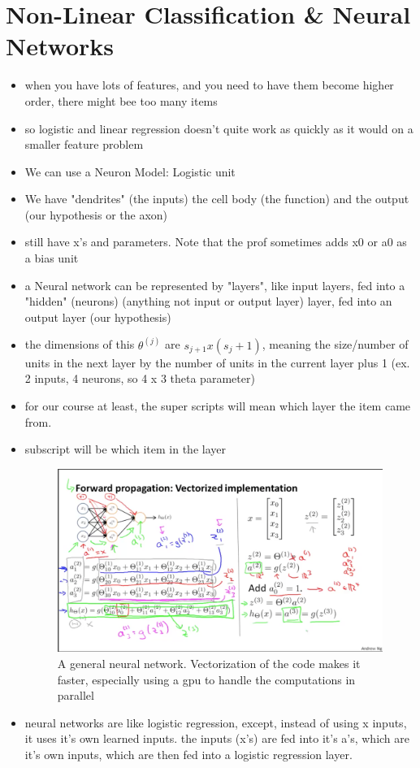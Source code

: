 \documentclass[]{article}
\begin{document}
\section{Non-Linear Classification \& Neural Networks}
	\begin{itemize}
		\item when you have lots of features, and you need to have them become higher order, there might bee too many items
		\item so logistic and linear regression doesn't quite work as quickly as it would on a smaller feature problem
		\\
		\item We can use a Neuron Model: Logistic unit
		\item We have "dendrites" (the inputs) the cell body (the function) and the output (our hypothesis or the axon)
		\item still have x's and parameters. Note that the prof sometimes adds x0 or a0 as a bias unit
		\item a Neural network can be represented by "layers", like input layers, fed into a "hidden" (neurons) (anything not input or output layer) layer, fed into an output layer (our hypothesis)
		\item the dimensions of this $\theta^{(j)}$ are $s_{j+1}x(s_j + 1)$, meaning the size/number of units in the next layer by the number of units in the current layer plus 1 (ex. 2 inputs, 4 neurons, so 4 x 3 theta parameter) 
		\item for our course at least, the super scripts will mean which layer the item came from.
		\item subscript will be which item in the layer
		\begin{figure}[ht!]
			\includegraphics[width=1.5\textwidth,center]{Forward_Propogation_and_Vectorization.png}
			\caption{A general neural network. Vectorization of the code makes it faster, especially using a gpu to handle the computations in parallel}
		\end{figure}
		\item neural networks are like logistic regression, except, instead of using x inputs, it uses it's own learned inputs. the inputs (x's) are fed into it's a's, which are it's own inputs, which are then fed into a logistic regression layer.
		

\end{itemize}
\end{document}
